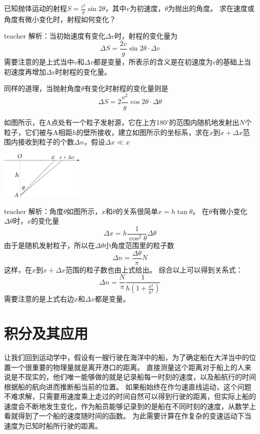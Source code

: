 \begin{example}
已知抛体运动的射程$S=\frac{v^2}{g}\sin 2\theta$，其中$v$为初速度，$\theta$为抛出的角度。
求在速度或角度有微小变化时，射程如何变化？
\begin{taggedblock}{teacher}
\newline
解析：当初始速度有变化$\Delta v$时，射程的变化量为
\[
\Delta S = \frac{2v}{g}\sin 2\theta\cdot \Delta v
\]
需要注意的是上式当中$v$和$\Delta v$都是变量，所表示的含义是在初速度为$v$的基础上当初速度再增加$\Delta v$时射程的变化量。

同样的道理，当抛射角度$\theta$有变化时射程的变化量则是
\[
\Delta S =2 \frac{v^2}{g}\cos 2\theta\cdot \Delta \theta
\]
\end{taggedblock}
\end{example}

\begin{example}
如图所示，在A点处有一个粒子发射源，它在上方$180^\circ$的范围内随机地发射出$N$个粒子，它们被与A相距$h$的壁所接收，建立如图所示的坐标系，求在$x$到$x+\Delta x$范围内接收到粒子的个数$\Delta n$，假设$\Delta x\ll x$
\begin{flushright}
\includegraphics[width = 0.3\textwidth]{images/cal-12.pdf} 
\end{flushright}
\begin{taggedblock}{teacher}
\noindent
解析：角度$\theta$如图所示，$x$和$\theta$的关系很简单$x=h\tan\theta$。
在$\theta$有微小变化$\Delta\theta$时，$x$的变化量
\[
\Delta x = h\frac{1}{\cos^2\theta}\Delta\theta
\]
由于是随机发射粒子，所以在$\Delta\theta$小角度范围里的粒子数
\[
\Delta n = \frac{\Delta\theta}{\pi}N
\]
这样，在$x$到$x+\Delta x$范围的粒子数也由上式给出。
综合以上可以得到关系式：
\[
\Delta n = \frac{N}{\pi}\frac{1}{h(1+\frac{x^2}{h^2})}
\]
需要注意的是上式右边$x$和$\Delta x$都是变量。
\end{taggedblock}
\end{example}


\section{积分及其应用}
让我们回到运动学中，假设有一艘行驶在海洋中的船，为了确定船在大洋当中的位置一个很重要的物理量就是离开港口的距离。
直接测量这个距离对于船上的人来说是不现实的，他们唯一能够做的就是记录船每一时刻的速度，以及船航行的时间根据船的航向进而推断船当前的位置。
如果船始终在作匀速直线运动，这个问题不难求解，只需要用速度乘上走过的时间自然可以得到行驶的距离，但实际上船的速度会不断地发生变化，作为船员能够记录到的是船在不同时刻的速度，从数学上看就得到了一个船的速度随时间的函数。
为此需要计算在作复杂的变速运动下当速度为已知时船所行驶的距离。

